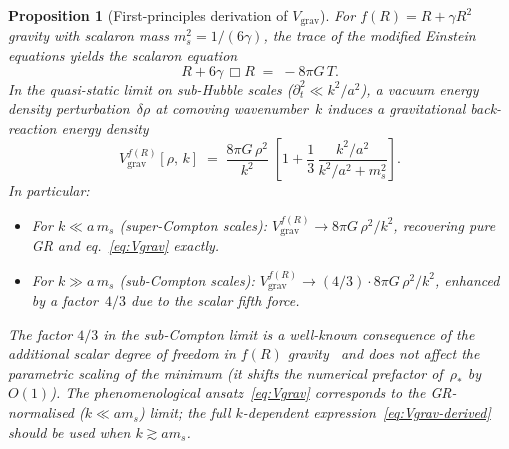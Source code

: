 \documentclass[12pt,a4paper]{article}
\theoremstyle{definition}
\theoremstyle{plain}
\newtheorem{proposition}[definition]{Proposition}
\theoremstyle{remark}
\begin{document}
\begin{proposition}[First-principles derivation of $V_{\mathrm{grav}}$]
\label{prop:Vgrav-from-fR}
For $f(R) = R + \gamma R^2$ gravity with scalaron mass
$m_s^2 = 1/(6\gamma)$, the trace of the modified Einstein equations yields
the scalaron equation
\begin{equation}\label{eq:trace-eqn}
  R + 6\gamma\,\Box R \;=\; -8\pi G\,T.
\end{equation}
In the quasi-static limit on sub-Hubble scales ($\partial_t^2 \ll k^2/a^2$),
a vacuum energy density perturbation~$\delta\rho$ at comoving wavenumber~$k$
induces a gravitational back-reaction energy density
\begin{equation}\label{eq:Vgrav-derived}
  V_{\mathrm{grav}}^{f(R)}[\rho,\,k]
  \;=\;
  \frac{8\pi G\,\rho^2}{k^2}
  \;\left[1 + \frac{1}{3}\,
  \frac{k^{2}/a^{2}}{k^{2}/a^{2} + m_{s}^{2}}\right].
\end{equation}
In particular:
\begin{itemize}
  \item For $k \ll a\,m_s$ (super-Compton scales):
    $V_{\mathrm{grav}}^{f(R)} \to 8\pi G\,\rho^2/k^2$,
    recovering pure GR and eq.~\eqref{eq:Vgrav} exactly.
  \item For $k \gg a\,m_s$ (sub-Compton scales):
    $V_{\mathrm{grav}}^{f(R)} \to (4/3)\cdot 8\pi G\,\rho^2/k^2$,
    enhanced by a factor~$4/3$ due to the scalar fifth force.
\end{itemize}
The factor $4/3$ in the sub-Compton limit is a well-known consequence of
the additional scalar degree of freedom in $f(R)$
gravity~\cite{HuSawicki2007} and does not affect the parametric scaling
of the minimum (it shifts the numerical prefactor
of~$\rho_\ast$ by $O(1)$).  The phenomenological
ansatz~\eqref{eq:Vgrav} corresponds to the GR-normalised ($k \ll am_s$)
limit; the full $k$-dependent expression~\eqref{eq:Vgrav-derived}
should be used when $k \gtrsim am_s$.
\end{proposition}
\end{document}
